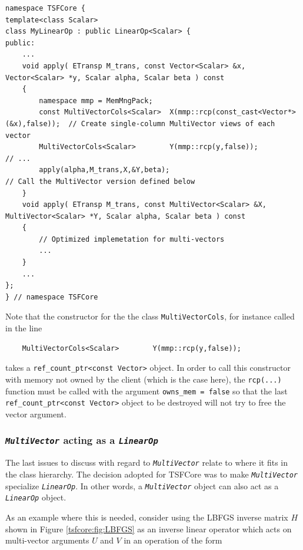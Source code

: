 \documentclass[10pt,fleqn]{article}
\begin{document}
{\scriptsize\begin{verbatim}
namespace TSFCore {
template<class Scalar>
class MyLinearOp : public LinearOp<Scalar> {
public:
    ...
    void apply( ETransp M_trans, const Vector<Scalar> &x, Vector<Scalar> *y, Scalar alpha, Scalar beta ) const
    {
        namespace mmp = MemMngPack;
        const MultiVectorCols<Scalar>  X(mmp::rcp(const_cast<Vector*>(&x),false));  // Create single-column MultiVector views of each vector
        MultiVectorCols<Scalar>        Y(mmp::rcp(y,false));                        // ...
        apply(alpha,M_trans,X,&Y,beta);                                             // Call the MultiVector version defined below
    }
    void apply( ETransp M_trans, const MultiVector<Scalar> &X, MultiVector<Scalar> *Y, Scalar alpha, Scalar beta ) const
    {
        // Optimized implemetation for multi-vectors
        ...
    }
    ...
};
} // namespace TSFCore
\end{verbatim}}

Note that the constructor for the the class \texttt{MultiVectorCols},
for instance called in the line

{\scriptsize\begin{verbatim}
    MultiVectorCols<Scalar>        Y(mmp::rcp(y,false));
\end{verbatim}}

takes a \texttt{ref\_count\_ptr<const Vector>} object.  In order to
call this constructor with memory not owned by the client (which is
the case here), the \texttt{rcp(...)} function must be called with the
argument \texttt{owns\_mem = false} so that the last
\texttt{ref\_count\_ptr<const Vector>} object to be destroyed will not try
to free the vector argument.

%
\subsubsection{\texttt{\textit{MultiVector}} acting as a \texttt{\textit{LinearOp}}}
\label{tsfcore:sec:multi_vec_linear_op}
%

The last issues to discuss with regard to
\texttt{\textit{MultiVector}} relate to where it fits in the class
hierarchy.  The decision adopted for TSFCore was to make
\texttt{\textit{MultiVector}} specialize \texttt{\textit{LinearOp}}.
In other words, a \texttt{\textit{MultiVector}} object can also act as
a \texttt{\textit{LinearOp}} object.

As an example where this is needed, consider using the LBFGS inverse
matrix $H$ shown in Figure \ref{tsfcore:fig:LBFGS} as an inverse linear
operator which acts on multi-vector arguments $U$ and $V$ in an
operation of the form
\end{document}
